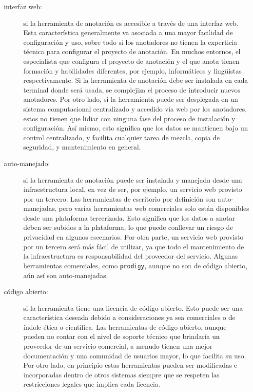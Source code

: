 \begin{description}
  \item[interfaz web:] si la herramienta de anotación es accesible a través de una interfaz web. Esta característica generalmente va asociada a una mayor facilidad de configuración y uso, sobre todo si los anotadores no tienen la experticia técnica para configurar el proyecto de anotación. En muchos entornos, el especialista que configura el proyecto de anotación y el que anota tienen formación y habilidades diferentes, por ejemplo, informáticos y lingüistas respectivamente. Si la herramienta de anotación debe ser instalada en cada terminal donde será usada, se complejiza el proceso de introducir nuevos anotadores. Por otro lado, si la herramienta puede ser desplegada en un sistema computacional centralizado y accedido vía web por los anotadores, estos no tienen que lidiar con ninguna fase del proceso de instalación y configuración. Así mismo, esto significa que los datos se mantienen bajo un control centralizado, y facilita cualquier tarea de mezcla, copia de seguridad, y mantenimiento en general.
  \item[auto-manejado:] si la herramienta de anotación puede ser instalada y manejada desde una infraestructura local, en vez de ser, por ejemplo, un servicio web provisto por un tercero. Las herramientas de escritorio por definición son auto-manejadas, pero varias herramientas web comerciales solo están disponibles desde una plataforma tercerizada. Esto significa que los datos a anotar deben ser subidos a la plataforma, lo que puede conllevar un riesgo de privacidad en algunos escenarios. Por otra parte, un servicio web provisto por un tercero será más fácil de utilizar, ya que todo el mantenimiento de la infraestructura es responsabilidad del proveedor del servicio. Algunas herramientas comerciales, como \texttt{prodigy}, aunque no son de código abierto, aún así son auto-manejadas.
  \item[código abierto:] si la herramienta tiene una licencia de código abierto. Esto puede ser  una característica deseada debido a consideraciones ya sea comerciales o de índole ética o científica. Las herramientas de código abierto, aunque pueden no contar con el nivel de soporte técnico que brindaría un proveedor de un servicio comercial, a menudo tienen una mejor documentación y una comunidad de usuarios mayor, lo que facilita su uso. Por otro lado, en principio estas herramientas pueden ser modificadas e incorporadas dentro de otros sistemas siempre que se respeten las restricciones legales que implica cada licencia.
\end{description}

